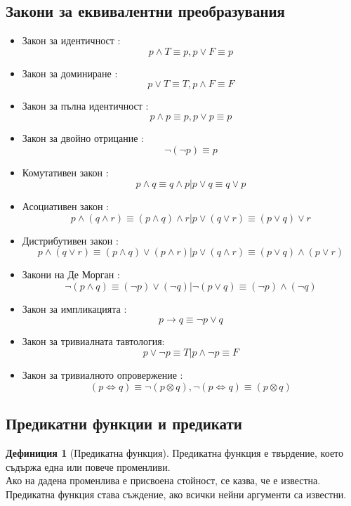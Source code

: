 \documentclass[fleqn, 12pt]{article}
\theoremstyle{definition}
\newtheorem{definition}{Дефиниция}[subsection]
\begin{document}
\newpage

\subsection{Закони за еквивалентни преобразувания}

\begin{itemize}
	\item Закон за идентичност : $$p \land T \equiv p , p \lor F \equiv p$$
	\item Закон за доминиране : $$p \lor T \equiv T , p \land F \equiv F$$
	\item Закон за пълна идентичност : $$p \land p \equiv p , p \lor p \equiv p$$
	\item Закон за двойно отрицание : $$\neg(\neg p) \equiv p $$
	\item Комутативен закон : $$p \land q \equiv q \land p | p \lor q \equiv q \lor p$$
	\item Асоциативен закон : $$p \land (q \land r) \equiv (p \land q ) \land r | p \lor (q \lor r) \equiv (p \lor q ) \lor r$$
	\item Дистрибутивен закон : $$p \land (q \lor r) \equiv (p \land q ) \lor (p \land r ) | p \lor (q \land r) \equiv (p \lor q ) \land (p \lor r )  $$
	\item Закони на Де Морган : $$\neg (p \land q) \equiv (\neg p) \lor (\neg q) | \neg (p \lor q) \equiv (\neg p) \land (\neg q) $$
	\item Закон за импликацията : $$p \rightarrow q \equiv \neg p \lor q$$
	\item Закон за тривиалната тавтология:  $$p \lor \neg p \equiv T | p \land \neg p \equiv F$$
	\item Закон за тривиалното опровержение : $$(p \Leftrightarrow q) \equiv \neg (p \otimes q), \neg (p \Leftrightarrow q) \equiv (p \otimes q) $$
\end{itemize}

\subsection{Предикатни функции и предикати}

\begin{definition}[Предикатна функция]
Предикатна функция е твърдение, което съдържа една или повече променливи. \\
Ако на дадена променлива е присвоена стойност, се казва, че е известна.\\
Предикатна функция става съждение, ако всички нейни аргументи са известни. \\
\end{definition}
\end{document}
